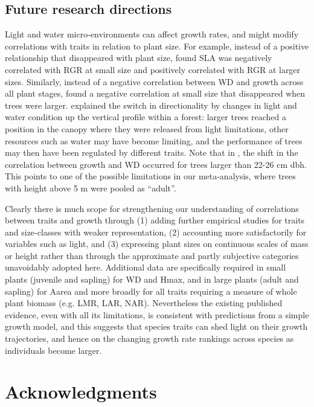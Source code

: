 \documentclass[a4paper]{article}\usepackage[]{graphicx}\usepackage[]{color}
\begin{document}
\subsection*{Future research directions}

Light and water micro-environments can affect growth rates, and might modify correlations with traits in relation to plant size. For example, instead of a positive relationship that disappeared with plant size, \citet{Iida:2014ep} found SLA was negatively correlated with RGR at small size and positively correlated with RGR at larger sizes. Similarly, instead of a negative correlation between WD and growth across all plant stages, \citep{Iida:2014ep,Iida:2014hq} found a negative correlation at small size that disappeared when trees were larger. \citet{Iida:2014hq} explained the switch in directionality by changes in light and water condition up the vertical profile within a forest: larger trees reached a position in the canopy where they were released from light limitations, other resources such as water may have become limiting, and the performance of trees may then have been regulated by different traits. Note that in \citet{Iida:2014hq}, the shift in the correlation between growth and WD occurred for trees larger than 22-26 cm dbh. This points to one of the possible limitations in our meta-analysis, where trees with height above 5 m were pooled as ``adult''.

Clearly there is much scope for strengthening our understanding of correlations between traits and growth through (1) adding further empirical studies for traits and size-classes with weaker representation, (2) accounting more satisfactorily for variables such as light, and (3) expressing plant sizes on continuous scales of mass or height rather than through the approximate and partly subjective categories unavoidably adopted here. Additional data are specifically required in small plants (juvenile and sapling) for WD and Hmax, and in large plants (adult and sapling) for Aarea and more broadly for all traits requiring a measure of whole plant biomass (e.g. LMR, LAR, NAR). Nevertheless the existing published evidence, even with all its limitations, is consistent with predictions from a simple growth model, and this suggests that species traits can shed light on their growth trajectories, and hence on the changing growth rate rankings across species as individuals become larger.

\section*{Acknowledgments}\label{Acknowledgment}
\end{document}
